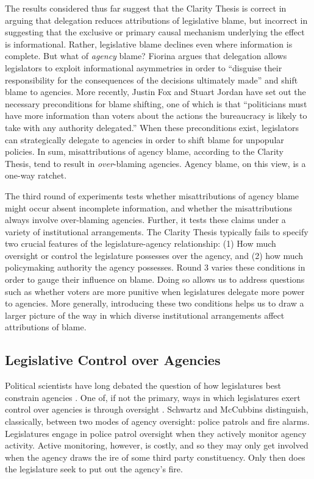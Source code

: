 \documentclass{article}
\begin{document}
The results considered thus far suggest that the Clarity Thesis is correct in arguing that delegation reduces attributions of legislative blame, but incorrect in suggesting that the exclusive or primary causal mechanism underlying the effect is informational. Rather, legislative blame declines even where information is complete. But what of \emph{agency} blame? Fiorina argues that delegation allows legislators to exploit informational asymmetries in order to ``disguise their responsibility for the consequences of the decisions ultimately made'' and shift blame to agencies. \citep[p. 47]{Fiorina1982} More recently, Justin Fox and Stuart Jordan have set out the necessary preconditions for blame shifting, one of which is that ``politicians must have more information than voters about the actions the bureaucracy is likely to take with any authority delegated.'' \citep[p. 843]{Fox2011} When these preconditions exist, legislators can strategically delegate to agencies in order to shift blame for unpopular policies. In sum, misattributions of agency blame, according to the Clarity Thesis, tend to result in \emph{over}-blaming agencies. Agency blame, on this view, is a one-way ratchet. 

The third round of experiments tests whether misattributions of agency blame might occur absent incomplete information, and whether the misattributions always involve over-blaming agencies. Further, it tests these claims under a variety of institutional arrangements. The Clarity Thesis typically fails to specify two crucial features of the legislature-agency relationship: (1) How much oversight or control the legislature possesses over the agency, and (2) how much policymaking authority the agency possesses. Round 3 varies these conditions in order to gauge their influence on blame. Doing so allows us to address questions such as whether voters are more punitive when legislatures delegate more power to agencies. More generally, introducing these two conditions helps us to draw a larger picture of the way in which diverse institutional arrangements affect attributions of blame. 

\subsection{Legislative Control over Agencies}

Political scientists have long debated the question of how legislatures best constrain agencies \citep{Lupia1994}. One of, if not the primary, ways in which legislatures exert control over agencies is through oversight \citep{Barkow2010}. Schwartz and McCubbins distinguish, classically, between two modes of agency oversight: police patrols and fire alarms. Legislatures engage in police patrol oversight when they actively monitor agency activity. Active monitoring, however, is costly, and so they may only get involved when the agency draws the ire of some third party constituency. Only then does the legislature seek to put out the agency's fire. 
\end{document}
